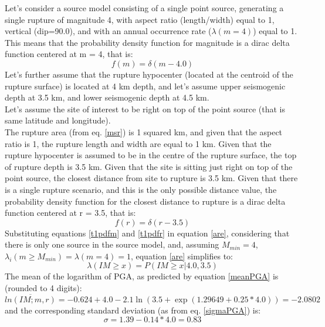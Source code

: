 Let's consider a source model consisting of a single point source, generating 
a single rupture of magnitude 4, with aspect ratio (length/width) equal to 1, 
vertical (dip=90.0), and with an annual occurrence rate ($\lambda(m=4)$) 
equal to 1. 
%
This means that the probability density function for magnitude is a dirac delta
function centered at m = 4, that is: \begin{equation} \label{t1pdfm} f(m) =
\delta(m - 4.0) \end{equation} Let's further assume that the rupture hypocenter
(located at the centroid of the rupture surface) is located at 4 km depth, and
let's assume upper seismogenic depth at 3.5 km, and lower seismogenic depth at
4.5 km.\\ Let's assume the site of interest to be right on top of the point
source (that is same latitude and longitude).\\ The rupture area (from eq.
\ref{msr}) is 1 squared km, and given that the aspect ratio is 1, the rupture
length and width are equal to 1 km. Given that the rupture hypocenter is assumed
to be in the centre of the rupture surface, the top of rupture depth is 3.5 km.
Given that the site is sitting just right on top of the point source, the
closest distance from site to rupture is 3.5 km.  Given that there is a single
rupture scenario, and this is the only possible distance value, the probability
density function for the closest distance to rupture is a dirac delta function
centered at r = 3.5, that is:
\begin{equation}
\label{t1pdfr}
f(r) = \delta(r - 3.5)
\end{equation}
Substituting equations \ref{t1pdfm} and \ref{t1pdfr} in equation \ref{are},
considering that there is only one source in the source model, and, assuming
$M_{min}=4$,  $\lambda_{i}(m\geq M_{min}) = \lambda(m=4) = 1$, equation
\ref{are} simplifies to:
\begin{equation}
\lambda(IM \geq x) = P(IM\geq x | 4.0, 3.5)
\end{equation}
The mean of the logarithm of PGA, as predicted by equation \ref{meanPGA} is
(rounded to 4 digits):
\begin{equation}
\overline{ln(IM;m,r)} = -0.624 + 4.0 - 2.1\ln(3.5 + \exp(1.29649 + 0.25 * 4.0)) = -2.0802
\end{equation}
and the corresponding standard deviation (as from eq. \ref{sigmaPGA}) is:
\begin{equation}
\sigma = 1.39 - 0.14 * 4.0  = 0.83
\end{equation}
